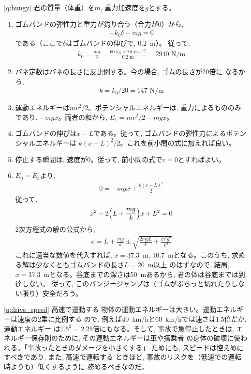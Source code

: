 \ref{q:bungy}
君の質量（体重）を$m$, 重力加速度を$g$とする。
\begin{enumerate}
\item ゴムバンドの弾性力と重力が釣り合う（合力が0）から, 
\begin{eqnarray}-k_0\delta+mg=0\end{eqnarray}
である（ここで$\delta$はゴムバンドの伸びで, 0.2~m）。
従って, 
\begin{eqnarray*}k_0=\frac{mg}{\delta}=\frac{60\text{ kg}\times9.8\text{ m s}^{-2}}{0.2\text{ m}}=2940\text{ N/m}\end{eqnarray*}
\item バネ定数はバネの長さに反比例する。今の場合, ゴムの長さが20倍に
なるから, 
\begin{eqnarray*}k=k_0/20=147\text{ N/m}\end{eqnarray*}
\item 運動エネルギーは$mv^2/2$。ポテンシャルエネルギーは, 重力によるもののみであり, 
$-mgx$。両者の和から, $E_1=mv^2/2-mgx$。
\item ゴムバンドの伸びは$x-L$である。従って, ゴムバンドの弾性力によるポテンシャルエネルギーは
$k(x-L)^2/2$。これを前小問の式に加えれば良い。
\item 停止する瞬間は, 速度が0。従って, 前小問の式で$v=0$とすればよい。
\item $E_0=E_3$より, 
\begin{eqnarray}0=-mgx+\frac{k(x-L)^2}{2}\end{eqnarray}
従って, 
\begin{eqnarray}x^2-2\Bigl(L+\frac{mg}{k}\Bigr)x+L^2=0\end{eqnarray}
2次方程式の解の公式から, 
\begin{eqnarray}
x=L+\frac{mg}{k}\pm\sqrt{\frac{2mgL}{k}+\frac{m^2g^2}{k^2}}
\end{eqnarray}
これに適当な数値を代入すれば, $x=$37.3~m, 10.7~mとなる。このうち, 求める解は少なくともゴムバンドの長さ$L=$20~m以上
のはずなので, 結局, $x=37.3$~mとなる。谷底までの深さは50~mあるから, 君の体は谷底までは到達しない。
従って, このバンジージャンプは（ゴムがぶちっと切れたりしない限り）安全だろう。
\end{enumerate}
\hv

\ref{q:drive_speed} 高速で運動する
物体の運動エネルギーは大きい。運動エネルギーは速度の2乗に比例する
ので, 例えば40~km/hと60~km/hでは速さは1.5倍だが, 運動エネルギー
は$1.5^2=2.25$倍にもなる。そして, 事故で急停止したときは, 
エネルギー保存則のために, その運動エネルギーは車や搭乗者
の身体の破壊に使われる。「事故ったときのダメージを小さくする」
ためにも, スピードは控えめにすべきであり, また, 高速で運転する
ときほど, 事故のリスクを（低速での運転時よりも）低くするように
務めるべきなのだ。\mv

